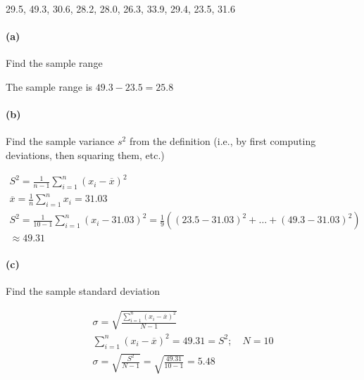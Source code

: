     29.5, 49.3, 30.6, 28.2, 28.0, 26.3, 33.9, 29.4, 23.5, 31.6

    \paragraph*{(a)}
    Find the sample range

    \begin{mdframed}
        The sample range is $49.3 - 23.5 = \boxed{25.8}$
    \end{mdframed}

    \paragraph*{(b)}
    Find the sample variance $s^2$ from the definition (i.e., by first computing deviations, then squaring them, etc.)

    \begin{mdframed}
        \begin{equation*}
            \begin{gathered}
                S^2 = \frac{1}{n-1}\sum_{i=1}^{n}(x_{i}-\overline{x})^2 \\
                \overline{x} = \frac{1}{n}\sum_{i=1}^{n}x_i = 31.03 \\
                S^2 = \frac{1}{10-1}\sum_{i=1}^{n}(x_{i}-31.03)^2 = \frac{1}{9}((23.5 - 31.03)^2 + \dots + (49.3 - 31.03)^2) \\
                \approx \boxed{49.31}
            \end{gathered}
        \end{equation*}
    \end{mdframed}

    \paragraph*{(c)}
    Find the sample standard deviation

    \begin{mdframed}
        \begin{equation*}
            \begin{gathered}
                \sigma = \sqrt{\frac{\sum\limits_{i=1}^{n}(x_i-\overline{x})^2}{N-1}} \\
                \sum_{i=1}^{n}(x_i-\overline{x})^2 = 49.31 = S^2; \quad N = 10 \\
                \sigma = \sqrt{\frac{S^2}{N-1}} = \sqrt{\frac{49.31}{10-1}} = \boxed{5.48}
            \end{gathered}
        \end{equation*}
    \end{mdframed}

